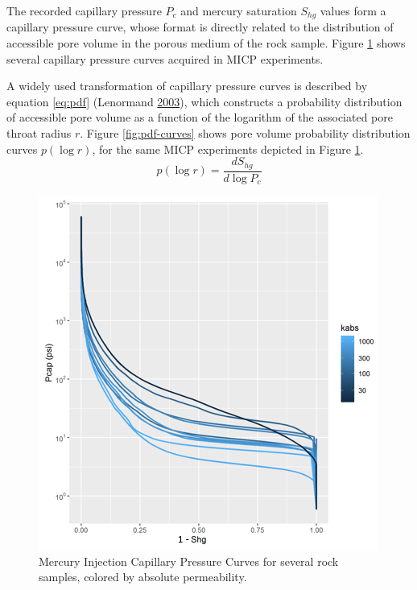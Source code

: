 \documentclass[english,msc,numbers]{coppe}
\begin{document}
  The recorded capillary pressure \(P_c\) and mercury saturation \(S_{hg}\) values form a capillary pressure curve, whose format is directly related to the distribution of accessible pore volume in the porous medium of the rock sample. Figure \ref{fig:pc-curves} shows several capillary pressure curves acquired in MICP experiments.
  
  A widely used transformation of capillary pressure curves is described by equation \eqref{eq:pdf} (Lenormand \protect\hyperlink{ref-Lenormand2003}{2003}), which constructs a probability distribution of accessible pore volume as a function of the logarithm of the associated pore throat radius \(r\). Figure \ref{fig:pdf-curves} shows pore volume probability distribution curves \(p(\log{r})\), for the same MICP experiments depicted in Figure \ref{fig:pc-curves}.
  \begin{equation} 
    p(\log{r}) = \frac{dS_{hg}}{d \log{P_c}}
    \label{eq:pdf}
  \end{equation}
  \begin{figure}
  
  {\centering \includegraphics[width=0.9\linewidth]{figure/2-4-Pc-curves} 
  
  }
  
  \caption{Mercury Injection Capillary Pressure Curves for several rock samples, colored by absolute permeability.}\label{fig:pc-curves}
  \end{figure}
\end{document}
